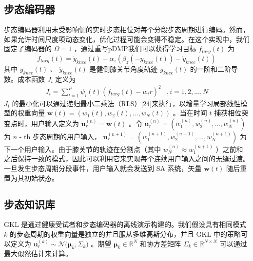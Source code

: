     \subsection{步态编码器  }    步态编码器利用未受影响侧的实时步态相位对每个分段步态周期进行编码。然而，如果允许时间尺度项动态变化，优化过程可能会变得不稳定。在这个实现中，我们固定了编码器的   $\Omega  = 1$   ，通过重写pDMP我们可以获得学习目标   ${f_{targ}}(t)$   为
   \begin{equation}
  \label{deqn_ex11}
  {f_{targ}}(t) = {\ddot y_{knee}}(t) - {\alpha _z}({\beta _z}( - {y_{knee}}(t)) - {\dot y_{knee}}(t))
\end{equation}    其中    ${\dot y_{knee}}(t)$    、    ${\ddot y_{knee}}(t)$    是健侧膝关节角度轨迹    ${y_{knee}}(t)$    的一阶和二阶导数。成本函数    ${J_i}$    定义为
    \begin{equation}
  \label{deqn_ex12}
  \begin{array}{*{20}{c}}
    {{J_i} = \sum\limits_{t = 1}^P {{\psi _i}} (t){{\left( {{f_{targ}}(t) - {w_i}r} \right)}^2}}&{,i = 1,2,...,N} 
  \end{array}
\end{equation}       ${J_i}$    的最小化可以通过递归最小二乘法（RLS）[24]来执行，以增量学习局部线性模型的权重向量    $\pmb{w}(t) = ({w_1}(t),{w_2}(t),...,{w_N}(t))$   。当在时间    $t$    捕获相位突变点时，用户输入定义为    $\pmb{u}_r^{(n)} = \pmb{w}(t)$    。令    $\pmb{u}_r^{(n)} = (w_1^{(n)},w_2^{(n)},...,w_N^{(n)})$    为    $n{\text{ - th}}$    步态周期的用户输入，   $\pmb{u}_r^{(n + 1)} = (w_1^{(n + 1)},w_2^{(n + 1)},...,w_N^{(n + 1)})$    为下一个用户输入。由于膝关节的轨迹在分割点（其中    $w_N^{(n)}\approx w_1^{(n+1)}$    ）之前和之后保持一致的模式，因此可以利用它来实现每个连续用户输入之间的无缝过渡。一旦发生步态周期分段事件，用户输入就会发送到 SA 系统，矢量    $\pmb{w}(t)$    随后重置为其初始状态。  

   \subsection{步态知识库  }    GKL 是通过健康受试者和步态编码器的离线演示构建的。我们假设具有相同模式    $k$    的步态周期的权重向量是独立的并且服从多维高斯分布，并且 GKL 中的策略可以定义为    $\pmb{u}_r^{(k)}\sim {\mathcal{N}}\pmb{(}{{\pmb{\mu }}_k},{\Sigma _k}\pmb{)}$    。期望   ${{\pmb{\mu }}_k} \in {\mathbb{R}^N}$   和协方差矩阵   ${\Sigma _k} \in {\mathbb{R}^{N \times N}}$   可以通过最大似然估计来计算。  

